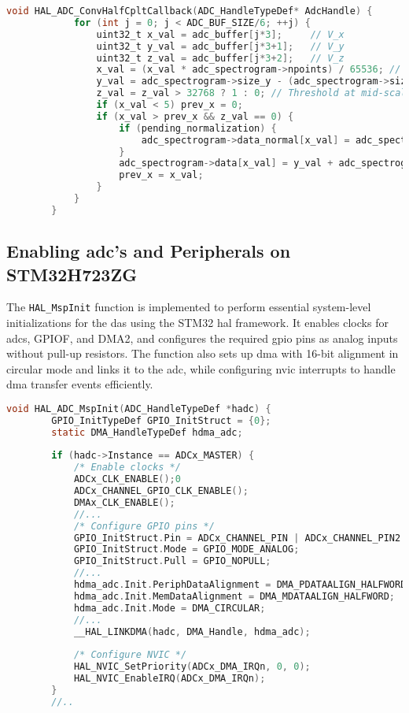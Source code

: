 \documentclass[class=report,11pt,crop=false]{standalone}
\begin{document}
	\begin{lstlisting}[language=C, label={lst:das-callbacks}, caption={Showing conversion callbacks for processing \acrshort{adc} data when the \acrshort{dma} fills half.}]
		void HAL_ADC_ConvHalfCpltCallback(ADC_HandleTypeDef* AdcHandle) {
			for (int j = 0; j < ADC_BUF_SIZE/6; ++j) {
				uint32_t x_val = adc_buffer[j*3];     // V_x
				uint32_t y_val = adc_buffer[j*3+1];   // V_y
				uint32_t z_val = adc_buffer[j*3+2];   // V_z
				x_val = (x_val * adc_spectrogram->npoints) / 65536; // 16-bit scaling
				y_val = adc_spectrogram->size_y - (adc_spectrogram->size_y * y_val) / 65536;
				z_val = z_val > 32768 ? 1 : 0; // Threshold at mid-scale (~1.65 V)
				if (x_val < 5) prev_x = 0;
				if (x_val > prev_x && z_val == 0) {
					if (pending_normalization) {
						adc_spectrogram->data_normal[x_val] = adc_spectrogram->size_y/2 - y_val;
					}
					adc_spectrogram->data[x_val] = y_val + adc_spectrogram->data_normal[x_val];
					prev_x = x_val;
				}
			}
		}
	\end{lstlisting}
	
	\subsection{Enabling \acrshort{adc}'s and Peripherals on STM32H723ZG}
	
	
	The \texttt{HAL\_MspInit} function is implemented to perform essential system-level initializations for the \acrshort{das} using the STM32 \acrshort{hal} framework. It enables clocks for \acrshort{adc}s, GPIOF, and DMA2, and configures the required \acrshort{gpio} pins as analog inputs without pull-up resistors. The function also sets up \acrshort{dma} with 16-bit alignment in circular mode and links it to the \acrshort{adc}, while configuring \acrshort{nvic} interrupts to handle \acrshort{dma} transfer events efficiently.
	
	\begin{lstlisting}[language=C, label={lst:das-callbacks}, caption={Showing conversion callbacks for processing \acrshort{adc} data when the \acrshort{dma} fills half.}]
	void HAL_ADC_MspInit(ADC_HandleTypeDef *hadc) {
		GPIO_InitTypeDef GPIO_InitStruct = {0};
		static DMA_HandleTypeDef hdma_adc;
		
		if (hadc->Instance == ADCx_MASTER) {
			/* Enable clocks */
			ADCx_CLK_ENABLE();0
			ADCx_CHANNEL_GPIO_CLK_ENABLE();
			DMAx_CLK_ENABLE();
			//...
			/* Configure GPIO pins */
			GPIO_InitStruct.Pin = ADCx_CHANNEL_PIN | ADCx_CHANNEL_PIN2 | ADCx_CHANNEL_PIN3;
			GPIO_InitStruct.Mode = GPIO_MODE_ANALOG;
			GPIO_InitStruct.Pull = GPIO_NOPULL;
			//...
			hdma_adc.Init.PeriphDataAlignment = DMA_PDATAALIGN_HALFWORD; // 16-bit
			hdma_adc.Init.MemDataAlignment = DMA_MDATAALIGN_HALFWORD;
			hdma_adc.Init.Mode = DMA_CIRCULAR;
			//...
			__HAL_LINKDMA(hadc, DMA_Handle, hdma_adc);
			
			/* Configure NVIC */
			HAL_NVIC_SetPriority(ADCx_DMA_IRQn, 0, 0);
			HAL_NVIC_EnableIRQ(ADCx_DMA_IRQn);
		}
		//..
	\end{lstlisting}
	
\end{document}
